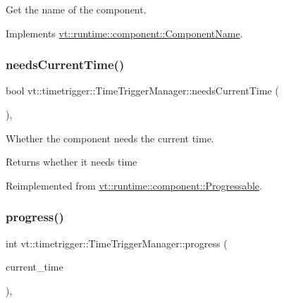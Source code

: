 Get the name of the component. 



Implements \hyperlink{structvt_1_1runtime_1_1component_1_1_component_name_a33c06229bb605a2b2ceff68830d6d773}{vt\+::runtime\+::component\+::\+Component\+Name}.

\mbox{\label{structvt_1_1timetrigger_1_1_time_trigger_manager_a2e65cfcbbbb1224b08263996b0fb1eff}} 
\subsubsection{\texorpdfstring{needs\+Current\+Time()}{needsCurrentTime()}}
{\footnotesize\ttfamily bool vt\+::timetrigger\+::\+Time\+Trigger\+Manager\+::needs\+Current\+Time (\begin{DoxyParamCaption}{ }\end{DoxyParamCaption})\hspace{0.3cm}{\ttfamily [override]}, {\ttfamily [virtual]}}



Whether the component needs the current time. 

\begin{DoxyReturn}{Returns}
whether it needs time 
\end{DoxyReturn}


Reimplemented from \hyperlink{structvt_1_1runtime_1_1component_1_1_progressable_a86dd4c58e43f7dbf6bd67f7a8e6df088}{vt\+::runtime\+::component\+::\+Progressable}.

\mbox{\label{structvt_1_1timetrigger_1_1_time_trigger_manager_a15cc796e1f07dbf32c04b3fb3f3ce06c}} 
\subsubsection{\texorpdfstring{progress()}{progress()}}
{\footnotesize\ttfamily int vt\+::timetrigger\+::\+Time\+Trigger\+Manager\+::progress (\begin{DoxyParamCaption}\item[{\hyperlink{namespacevt_a876a9d0cd5a952859c72de8a46881442}{Time\+Type}}]{current\+\_\+time }\end{DoxyParamCaption})\hspace{0.3cm}{\ttfamily [override]}, {\ttfamily [virtual]}}



